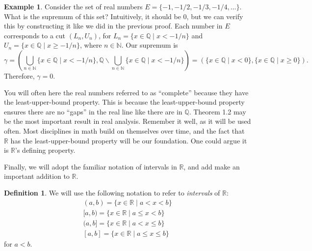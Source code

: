 \documentclass{article}
\newcommand{\N}{\mathbb{N}}
\newcommand{\R}{\mathbb{R}}
\newcommand{\Q}{\mathbb{Q}}
\theoremstyle{definition}
\newtheorem{definition}{Definition}[section]
\newtheorem{example}{Example}[section]
\begin{document}
	\begin{example}
		Consider the set of real numbers $ E=\{-1,-1/2,-1/3,-1/4,\ldots\} $. What is the supremum of this set? Intuitively, it should be $ 0 $, but we can verify this by constructing it like we did in the previous proof. Each number in $ E $ corresponds to a cut $ (L_n,U_n) $, for $ L_n=\{x\in\Q\mid x<-1/n\} $ and $ U_n=\{x\in\Q\mid x\ge -1/n\} $, where $ n\in\N $. Our supremum is $$\gamma=\left(\bigcup_{n\in \N}\{x\in\Q\mid x<-1/n\},\Q\backslash \bigcup_{n\in \N}\{x\in\Q\mid x<-1/n\}\right)=(\{x\in\Q\mid x<0\},\{x\in\Q\mid x\ge0\}). $$ Therefore, $ \gamma=0 $.  
	\end{example}
	You will often here the real numbers referred to as ``complete'' because they have the least-upper-bound property. This is because the least-upper-bound property ensures there are no ``gaps'' in the real line like there are in $ \Q $. Theorem 1.2 may be the most important result in real analysis. Remember it well, as it will be used often. Most disciplines in math build on themselves over time, and the fact that $ \R $ has the least-upper-bound property will be our foundation. One could argue it is $ \R $'s defining property.  
	
	Finally, we will adopt the familiar notation of intervals in $ \R $, and add make an important addition to $ \R $. 
	\begin{definition}\label{def1.18}
		We will use the following notation to refer to \textit{\color{red} intervals} of $ \R $:
		\begin{align*}
			(a,b)=\{x\in\R\mid a<x<b\}\\
			[a,b)=\{x\in\R\mid a\le x<b\}\\
			(a,b]=\{x\in\R\mid a<x\le b\}\\
			[a,b]=\{x\in\R\mid a\le x\le b\}
		\end{align*}
		for $ a<b $. 
	\end{definition}
\end{document}

